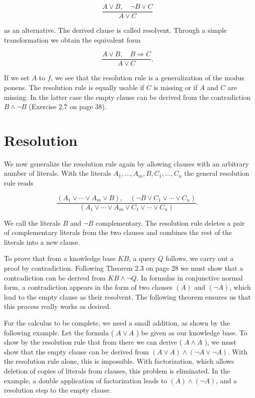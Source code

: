 \documentclass[10pt]{book}
\begin{document}
\begin{equation*}
\frac{A \vee B, \quad \neg B \vee C}{A \vee C} \tag{2.1}
\end{equation*}


as an alternative. The derived clause is called resolvent. Through a simple transformation we obtain the equivalent form

$$
\frac{A \vee B, \quad B \Rightarrow C}{A \vee C} .
$$

If we set $A$ to $f$, we see that the resolution rule is a generalization of the modus ponens. The resolution rule is equally usable if $C$ is missing or if $A$ and $C$ are missing. In the latter case the empty clause can be derived from the contradiction $B \wedge \neg B$ (Exercise 2.7 on page 38).

\section{Resolution}
We now generalize the resolution rule again by allowing clauses with an arbitrary number of literals. With the literals $A_{1}, \ldots, A_{m}, B, C_{1}, \ldots, C_{n}$ the general resolution rule reads


\begin{equation*}
\frac{\left(A_{1} \vee \cdots \vee A_{m} \vee B\right), \quad\left(\neg B \vee C_{1} \vee \cdots \vee C_{n}\right)}{\left(A_{1} \vee \cdots \vee A_{m} \vee C_{1} \vee \cdots \vee C_{n}\right)} . \tag{2.2}
\end{equation*}


We call the literals $B$ and $\neg B$ complementary. The resolution rule deletes a pair of complementary literals from the two clauses and combines the rest of the literals into a new clause.


To prove that from a knowledge base $K B$, a query $Q$ follows, we carry out a proof by contradiction. Following Theorem 2.3 on page 28 we must show that a contradiction can be derived from $K B \wedge \neg Q$. In formulas in conjunctive normal form, a contradiction appears in the form of two clauses $(A)$ and $(\neg A)$, which lead to the empty clause as their resolvent. The following theorem ensures us that this process really works as desired.

For the calculus to be complete, we need a small addition, as shown by the following example. Let the formula ( $A \vee A$ ) be given as our knowledge base. To show by the resolution rule that from there we can derive ( $A \wedge A$ ), we must show that the empty clause can be derived from $(A \vee A) \wedge(\neg A \vee \neg A)$. With the resolution rule alone, this is impossible. With factorization, which allows deletion of copies of literals from clauses, this problem is eliminated. In the example, a double application of factorization leads to $(A) \wedge(\neg A)$, and a resolution step to the empty clause.
\end{document}
